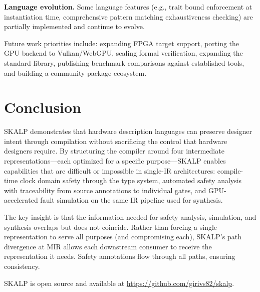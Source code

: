 \documentclass[conference]{IEEEtran}
\begin{document}
\textbf{Language evolution.} Some language features (e.g., trait bound enforcement at instantiation time, comprehensive pattern matching exhaustiveness checking) are partially implemented and continue to evolve.

Future work priorities include: expanding FPGA target support, porting the GPU backend to Vulkan/WebGPU, scaling formal verification, expanding the standard library, publishing benchmark comparisons against established tools, and building a community package ecosystem.

\section{Conclusion}
\label{sec:conclusion}

SKALP demonstrates that hardware description languages can preserve designer intent through compilation without sacrificing the control that hardware designers require. By structuring the compiler around four intermediate representations---each optimized for a specific purpose---SKALP enables capabilities that are difficult or impossible in single-IR architectures: compile-time clock domain safety through the type system, automated safety analysis with traceability from source annotations to individual gates, and GPU-accelerated fault simulation on the same IR pipeline used for synthesis.

The key insight is that the information needed for safety analysis, simulation, and synthesis overlaps but does not coincide. Rather than forcing a single representation to serve all purposes (and compromising each), SKALP's path divergence at MIR allows each downstream consumer to receive the representation it needs. Safety annotations flow through all paths, ensuring consistency.

SKALP is open source and available at \url{https://github.com/girivs82/skalp}.


\end{document}
